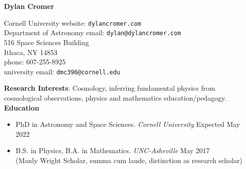 \documentclass[a4paper, 11pt]{article}
\title{}
\author{}
\date{Last Edited: \today}
\newcommand{\myrule}{\hrulefill}
\newcommand{\noi}{\noindent}
\begin{document}
\begin{center} 
\textbf{Dylan Cromer} 
\\
\myrule
\end{center}

\noi Cornell University \hfill website: \texttt{dylancromer.com}
\\
Department of Astronomy \hfill email: \texttt{dylan@dylancromer.com}
\\
516 Space Sciences Building \hfill
\\
Ithaca, NY 14853 \hfill
\\
phone: 607-255-8925 \hfill
\\
university email: \texttt{dmc396@cornell.edu} \hfill
\\

\fancyfoot{\myrule \\ Dylan Cromer \hfill \thepage}

\noi \textbf{Research Interests}: Cosmology, inferring fundamental physics from cosmological observations, physics and mathematics education/pedagogy.
\\

\noi \textbf{Education}
\begin{itemize}[leftmargin=*]

	\item PhD in Astronomy and Space Sciences. \emph{Cornell University} \hfill Expected May 2022
	
	\item \noi B.S. in Physics, B.A. in Mathematics. \emph{UNC-Asheville} \hfill May 2017
		\\
	(Manly Wright Scholar, summa cum laude, distinction as research scholar)

\end{itemize}
\end{document}
